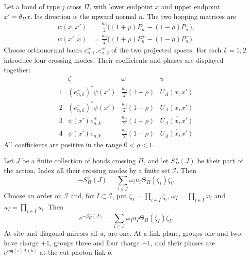 Let a bond of type $j$ cross $\Pi$, with lower endpoint $x$ and upper
endpoint $x'=\theta_\Pi x$. Its direction is the upward normal $n$.
The two hopping matrices are
\begin{equation}\label{eq:reg-crossing-projectors}
 \begin{split}
 w(x,x')&=\tfrac{w_j}{2}\bigl((1+\rho)P_n^--(1-\rho)P_n^+\bigr),\\
 w(x',x)&=\tfrac{w_j}{2}\bigl((1+\rho)P_n^+-(1-\rho)P_n^-\bigr).
 \end{split}
\end{equation}
Choose orthonormal bases $e_{n,1}^\pm,e_{n,2}^\pm$ of the two
projected spaces. For each $k=1,2$ introduce four crossing modes.
Their coefficients and phases are displayed together:
\begin{equation}\label{eq:reg-crossing-modes}
\begin{array}{c|c|c|c}
 &\zeta&\omega&u\\ \hline
 1&(e_{n,k}^-)^*\psi(x')&\tfrac{w_j}{2}(1+\rho)&U_A(x,x')\\
 2&(e_{n,k}^+)^*\psi(x')&\tfrac{w_j}{2}(1-\rho)&U_A(x,x')\\
 3&\bar\psi(x')e_{n,k}^+&\tfrac{w_j}{2}(1+\rho)&\overline{U_A(x,x')}\\
 4&\bar\psi(x')e_{n,k}^-&\tfrac{w_j}{2}(1-\rho)&\overline{U_A(x,x')}
\end{array}
\end{equation}
All coefficients are positive in the range $0<\rho<1$.

\begin{proposition}\label{prop:reg-crossing-expansion}
Let $J$ be a finite collection of bonds crossing $\Pi$, and let
$S_\Pi^\times(J)$ be their part of the action. Index all their crossing
modes by a finite set $\mathcal I$. Then
\begin{equation}\label{eq:reg-crossing-positive}
 -S_\Pi^\times(J)=\sum_{i\in\mathcal I}\omega_i u_i\Theta_\Pi(\zeta_i)\zeta_i.
\end{equation}
Choose an order on $\mathcal I$ and, for $I\subset\mathcal I$, put
$\zeta_I=\prod_{i\in I}\zeta_i$, $\omega_I=\prod_{i\in I}\omega_i$
and $u_I=\prod_{i\in I}u_i$. Then
\begin{equation}\label{eq:reg-crossing-exponential}
 e^{-S_\Pi^\times(J)}=\sum_{I\subset\mathcal I}\omega_Iu_I\Theta_\Pi(\zeta_I)\zeta_I.
\end{equation}
At site and diagonal mirrors all $u_i$ are one. At a link plane,
groups one and two have charge $+1$, groups three and four charge
$-1$, and their phases are $e^{iq\mathfrak q(i)A(b)}$ at the cut
photon link $b$.
\end{proposition}


